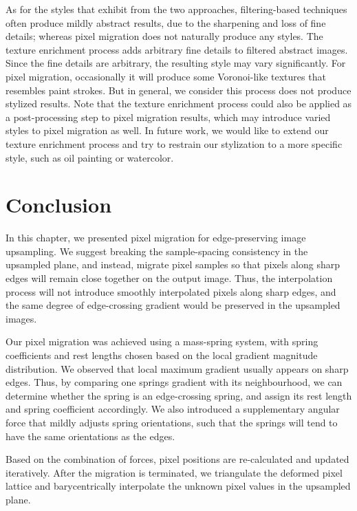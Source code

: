 As for the styles that exhibit from the two approaches, filtering-based techniques often produce mildly abstract results, due to the sharpening and loss of fine details; whereas pixel migration does not naturally produce any styles. The texture enrichment process adds arbitrary fine details to filtered abstract images. Since the fine details are arbitrary, the resulting style may vary significantly. For pixel migration, occasionally it will produce some Voronoi-like textures that resembles paint strokes. But in general, we consider this process does not produce stylized results. Note that the texture enrichment process could also be applied as a post-processing step to pixel migration results, which may introduce varied styles to pixel migration as well. In future work, we would like to extend our texture enrichment process and try to restrain our stylization to a more specific style, such as oil painting or watercolor. 


\section{Conclusion}\label{PM:conclusion}

In this chapter, we presented pixel migration for edge-preserving image upsampling. We suggest breaking the sample-spacing consistency in the upsampled plane, and instead, migrate pixel samples so that pixels along sharp edges will remain close together on the output image. Thus, the interpolation process will not introduce smoothly interpolated pixels along sharp edges, and the same degree of edge-crossing gradient would be preserved in the upsampled images. 

Our pixel migration was achieved using a mass-spring system, with spring coefficients and rest lengths chosen based on the local gradient magnitude distribution. We observed that local maximum gradient usually appears on sharp edges. Thus, by comparing one spring\textquotesingle s gradient with its neighbourhood, we can determine whether the spring is an edge-crossing spring, and assign its rest length and spring coefficient accordingly. We also introduced a supplementary angular force that mildly adjusts spring orientations, such that the springs will tend to have the same orientations as the edges.

Based on the combination of forces, pixel positions are re-calculated and updated iteratively. After the migration is terminated, we triangulate the deformed pixel lattice and barycentrically interpolate the unknown pixel values in the upsampled plane. 

